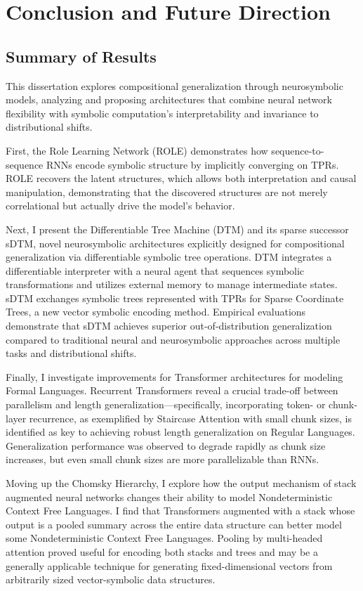 \chapter{Conclusion and Future Direction} \label{chap:chap-6}
\section{Summary of Results}

This dissertation explores compositional generalization through neurosymbolic models, analyzing and proposing architectures that combine neural network flexibility with symbolic computation's interpretability and invariance to distributional shifts.

First, the Role Learning Network (ROLE) demonstrates how sequence-to-sequence RNNs encode symbolic structure by implicitly converging on TPRs. ROLE recovers the latent structures, which allows both interpretation and causal manipulation, demonstrating that the discovered structures are not merely correlational but actually drive the model's behavior.

Next, I present the Differentiable Tree Machine (DTM) and its sparse successor sDTM, novel neurosymbolic architectures explicitly designed for compositional generalization via differentiable symbolic tree operations. DTM integrates a differentiable interpreter with a neural agent that sequences symbolic transformations and utilizes external memory to manage intermediate states. sDTM exchanges symbolic trees represented with TPRs for Sparse Coordinate Trees, a new vector symbolic encoding method. Empirical evaluations demonstrate that sDTM achieves superior out-of-distribution generalization compared to traditional neural and neurosymbolic approaches across multiple tasks and distributional shifts.
 
Finally, I investigate improvements for Transformer architectures for modeling Formal Languages. Recurrent Transformers reveal a crucial trade-off between parallelism and length generalization—specifically, incorporating token- or chunk- layer recurrence, as exemplified by Staircase Attention with small chunk sizes, is identified as key to achieving robust length generalization on Regular Languages. Generalization performance was observed to degrade rapidly as chunk size increases, but even small chunk sizes are more parallelizable than RNNs.

Moving up the Chomsky Hierarchy, I explore how the output mechanism of stack augmented neural networks changes their ability to model Nondeterministic Context Free Languages. I find that Transformers augmented with a stack whose output is a pooled summary across the entire data structure can better model some Nondeterministic Context Free Languages. Pooling by multi-headed attention proved useful for encoding both stacks and trees and may be a generally applicable technique for generating fixed-dimensional vectors from arbitrarily sized vector-symbolic data structures.


